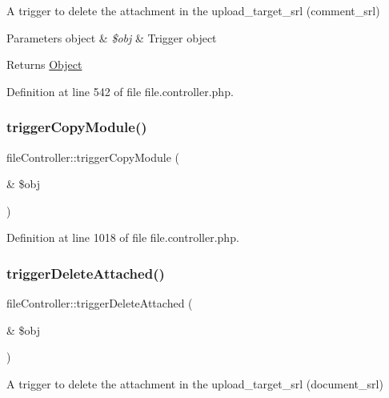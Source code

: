 A trigger to delete the attachment in the upload\+\_\+target\+\_\+srl (comment\+\_\+srl)


\begin{DoxyParams}[1]{Parameters}
object & {\em \$obj} & Trigger object \\
\hline
\end{DoxyParams}
\begin{DoxyReturn}{Returns}
\hyperlink{classObject}{Object} 
\end{DoxyReturn}


Definition at line 542 of file file.\+controller.\+php.

\hypertarget{classfileController_a043759003f14e91db0f4fb554955fba8}{}\label{classfileController_a043759003f14e91db0f4fb554955fba8} 
\subsubsection{\texorpdfstring{trigger\+Copy\+Module()}{triggerCopyModule()}}
{\footnotesize\ttfamily file\+Controller\+::trigger\+Copy\+Module (\begin{DoxyParamCaption}\item[{\&}]{\$obj }\end{DoxyParamCaption})}



Definition at line 1018 of file file.\+controller.\+php.

\hypertarget{classfileController_aaa8d73e09e5aa3a5a6807dffb578d84c}{}\label{classfileController_aaa8d73e09e5aa3a5a6807dffb578d84c} 
\subsubsection{\texorpdfstring{trigger\+Delete\+Attached()}{triggerDeleteAttached()}}
{\footnotesize\ttfamily file\+Controller\+::trigger\+Delete\+Attached (\begin{DoxyParamCaption}\item[{\&}]{\$obj }\end{DoxyParamCaption})}

A trigger to delete the attachment in the upload\+\_\+target\+\_\+srl (document\+\_\+srl)


